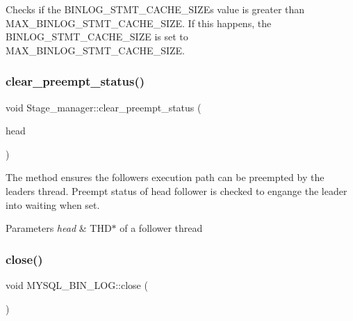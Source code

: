 Checks if the B\+I\+N\+L\+O\+G\+\_\+\+S\+T\+M\+T\+\_\+\+C\+A\+C\+H\+E\+\_\+\+S\+I\+ZE\textquotesingle{}s value is greater than M\+A\+X\+\_\+\+B\+I\+N\+L\+O\+G\+\_\+\+S\+T\+M\+T\+\_\+\+C\+A\+C\+H\+E\+\_\+\+S\+I\+ZE. If this happens, the B\+I\+N\+L\+O\+G\+\_\+\+S\+T\+M\+T\+\_\+\+C\+A\+C\+H\+E\+\_\+\+S\+I\+ZE is set to M\+A\+X\+\_\+\+B\+I\+N\+L\+O\+G\+\_\+\+S\+T\+M\+T\+\_\+\+C\+A\+C\+H\+E\+\_\+\+S\+I\+ZE. \mbox{\label{group__Binary__Log_gad3389586ace2de50ee7606d7acc98849}} 
\subsubsection{\texorpdfstring{clear\+\_\+preempt\+\_\+status()}{clear\_preempt\_status()}}
{\footnotesize\ttfamily void Stage\+\_\+manager\+::clear\+\_\+preempt\+\_\+status (\begin{DoxyParamCaption}\item[{T\+HD $\ast$}]{head }\end{DoxyParamCaption})}

The method ensures the follower\textquotesingle{}s execution path can be preempted by the leader\textquotesingle{}s thread. Preempt status of {\ttfamily head} follower is checked to engange the leader into waiting when set.


\begin{DoxyParams}{Parameters}
{\em head} & T\+H\+D$\ast$ of a follower thread \\
\hline
\end{DoxyParams}
\mbox{\label{group__Binary__Log_ga22e829bf97dfac49c3b05a2cbdbaf7cb}} 
\subsubsection{\texorpdfstring{close()}{close()}\hspace{0.1cm}{\footnotesize\ttfamily [1/2]}}
{\footnotesize\ttfamily void M\+Y\+S\+Q\+L\+\_\+\+B\+I\+N\+\_\+\+L\+O\+G\+::close (\begin{DoxyParamCaption}{ }\end{DoxyParamCaption})\hspace{0.3cm}{\ttfamily [virtual]}}

